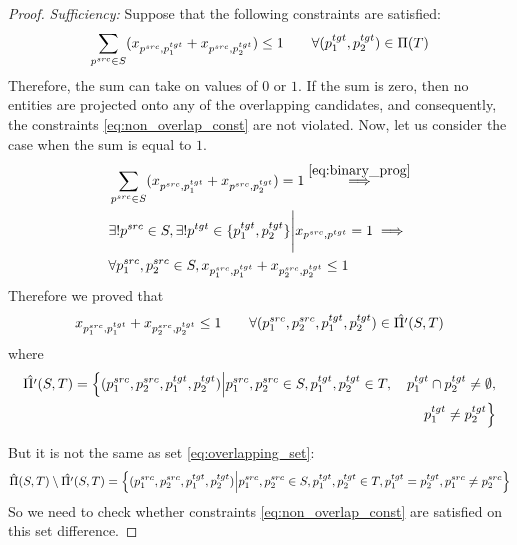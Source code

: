\begin{proof}
  \textit{Sufficiency:}
  Suppose that the following constraints are satisfied:
  \[
    \sum\limits_{p^{src} \in S} (x_{p^{src}, p_1^{tgt}} + x_{p^{src}, p_2^{tgt}}) \leq 1
    \qquad \forall (p_1^{tgt}, p_2^{tgt}) \in \Pi(T)
  \]
  Therefore, the sum can take on values of \( 0 \) or \( 1 \).
  If the sum is zero, then no entities are projected onto any of the overlapping
  candidates, and consequently, the constraints \eqref{eq:non_overlap_const} are
  not violated. Now, let us consider the case when the sum is equal to \( 1 \).
  \begin{equation*} \label{eq:derivation_of_const_reduction}
    \begin{aligned}
      & \sum\limits_{p^{src} \in S} (x_{p^{src}, p_1^{tgt}} + x_{p^{src}, p_2^{tgt}}) = 1
      \stackrel{\eqref{eq:binary_prog}}{\implies}                                                       \\
      & \exists! p^{src} \in S, \exists! p^{tgt} \in \{ p_1^{tgt}, p_2^{tgt}\}
      \Bigg| x_{p^{src}, p^{tgt}} = 1 \implies                                                          \\
      & \forall p_1^{src}, p_2^{src} \in S, x_{p_1^{src}, p_1^{tgt}} + x_{p_2^{src}, p_2^{tgt}} \leq 1
    \end{aligned}
  \end{equation*}
  Therefore we proved that
  \[
    x_{p_1^{src}, p_1^{tgt}} + x_{p_2^{src}, p_2^{tgt}} \leq 1 \qquad
    \forall (p_1^{src}, p_2^{src}, p_1^{tgt}, p_2^{tgt}) \in \hat{\Pi'}(S, T)
  \]
  where
  \begin{align*}
    \hat{\Pi'}(S, T) = \Big\{ (p_1^{src}, p_2^{src}, p_1^{tgt}, p_2^{tgt}) \Big| p_1^{src}, p_2^{src} \in S, p_1^{tgt}, p_2^{tgt} \in T, \quad p_1^{tgt} \cap p_2^{tgt} \neq \emptyset, \\
    p_1^{tgt} \neq p_2^{tgt} \Big\}
  \end{align*}

  But it is not the same as set \eqref{eq:overlapping_set}:
  \[
    \hat{\Pi}(S, T) \setminus \hat{\Pi'}(S, T) = \Big\{ (p_1^{src}, p_2^{src}, p_1^{tgt}, p_2^{tgt}) \Big| p_1^{src}, p_2^{src} \in S, p_1^{tgt}, p_2^{tgt} \in T, p_1^{tgt} = p_2^{tgt},
    p_1^{src} \neq p_2^{src} \Big\}
  \]
  So we need to check whether constraints \eqref{eq:non_overlap_const} are satisfied on this set difference.


\end{proof}
